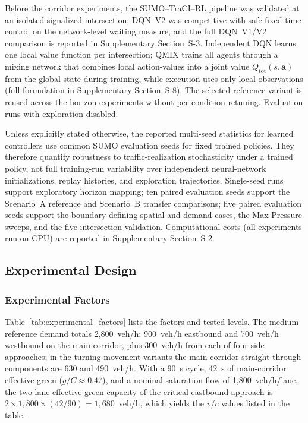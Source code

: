 \documentclass[review,12pt]{elsarticle}
\begin{document}
Before the corridor experiments, the SUMO--TraCI--RL pipeline was validated at an isolated signalized intersection; DQN~V2 was competitive with safe fixed-time control on the network-level waiting measure, and the full DQN~V1/V2 comparison is reported in Supplementary Section~S-3. Independent DQN learns one local value function per intersection; QMIX trains all agents through a mixing network that combines local action-values into a joint value $Q_{\mathrm{tot}}(s,\mathbf{a})$ from the global state during training, while execution uses only local observations (full formulation in Supplementary Section~S-8). The selected reference variant is reused across the horizon experiments without per-condition retuning. Evaluation runs with exploration disabled.

Unless explicitly stated otherwise, the reported multi-seed statistics for learned controllers use common SUMO evaluation seeds for fixed trained policies. They therefore quantify robustness to traffic-realization stochasticity under a trained policy, not full training-run variability over independent neural-network initializations, replay histories, and exploration trajectories. Single-seed runs support exploratory horizon mapping; ten paired evaluation seeds support the Scenario~A reference and Scenario~B transfer comparisons; five paired evaluation seeds support the boundary-defining spatial and demand cases, the Max Pressure sweeps, and the five-intersection validation. Computational costs (all experiments run on CPU) are reported in Supplementary Section~S-2.

\subsection{Experimental Design}
\label{sec:experimental_design}

\subsubsection{Experimental Factors}

Table~\ref{tab:experimental_factors} lists the factors and tested levels. The medium reference demand totals 2{,}800~veh/h: 900~veh/h eastbound and 700~veh/h westbound on the main corridor, plus 300~veh/h from each of four side approaches; in the turning-movement variants the main-corridor straight-through components are 630 and 490~veh/h. With a 90~s cycle, 42~s of main-corridor effective green ($g/C\approx0.47$), and a nominal saturation flow of 1{,}800~veh/h/lane, the two-lane effective-green capacity of the critical eastbound approach is $2\times1{,}800\times(42/90)=1{,}680$~veh/h, which yields the $v/c$ values listed in the table.
\end{document}
